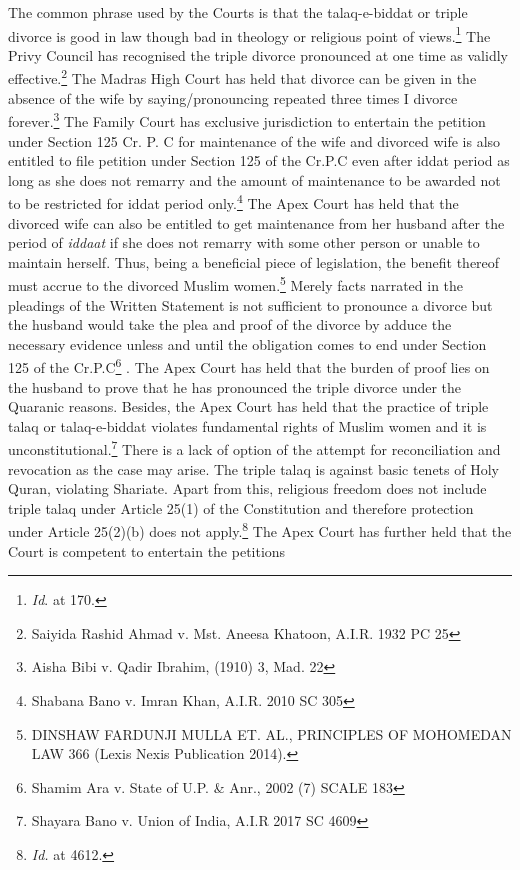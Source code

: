 \begin{multicols}{2}


The common phrase used by the Courts is that the talaq-e-biddat or triple divorce is good in
law though bad in theology or religious point of views.\footnote{{\it Id}. at 170.} The Privy Council has recognised
the triple divorce pronounced at one time as validly effective.\footnote{Saiyida Rashid Ahmad v. Mst. Aneesa Khatoon, A.I.R. 1932 PC 25} The Madras High Court has
held that divorce can be given in the absence of the wife by saying/pronouncing repeated
three times I divorce forever.\footnote{Aisha Bibi v. Qadir Ibrahim, (1910) 3, Mad. 22} The Family Court has exclusive jurisdiction to entertain the
petition under Section 125 Cr. P. C for maintenance of the wife and divorced wife is also
entitled to file petition under Section 125 of the Cr.P.C even after iddat period as long as she
does not remarry and the amount of maintenance to be awarded not to be restricted for iddat
period only.\footnote{Shabana Bano v. Imran Khan, A.I.R. 2010 SC 305} The Apex Court has held that the divorced wife can also be entitled to get
maintenance from her husband after the period of {\it iddaat} if she does not remarry with some other person or unable to maintain herself. Thus, being a beneficial piece of legislation, the
benefit thereof must accrue to the divorced Muslim women.\footnote{DINSHAW FARDUNJI MULLA ET. AL., PRINCIPLES OF MOHOMEDAN LAW 366 (Lexis Nexis
Publication 2014).} Merely facts narrated in the
pleadings of the Written Statement is not sufficient to pronounce a divorce but the husband
would take the plea and proof of the divorce by adduce the necessary evidence unless and
until the obligation comes to end under Section 125 of the Cr.P.C\footnote{Shamim Ara v. State of U.P. \& Anr., 2002 (7) SCALE 183}
.
The Apex Court has held that the burden of proof lies on the husband to prove that he has
pronounced the triple divorce under the Quaranic reasons. Besides, the Apex Court has held
that the practice of triple talaq or talaq-e-biddat violates fundamental rights of Muslim
women and it is unconstitutional.\footnote{Shayara Bano v. Union of India, A.I.R 2017 SC 4609} There is a lack of option of the attempt for reconciliation
and revocation as the case may arise. The triple talaq is against basic tenets of Holy Quran,
violating Shariate. Apart from this, religious freedom does not include triple talaq under
Article 25(1) of the Constitution and therefore protection under Article 25(2)(b) does not
apply.\footnote{{\it Id.} at 4612.} The Apex Court has further held that the Court is competent to entertain the petitions

\end{multicols}
